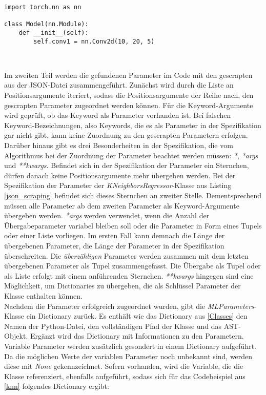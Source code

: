 \documentclass[german,bachelor]{swsLeipzig}
\begin{document}
\noindent\begin{minipage}{\linewidth}
\begin{lstlisting}[language=iPython, frame=single, label=nn_module,  basicstyle=\small, caption={Vererbung der ML-Klasse Module aus PyTorch},captionpos=b]
import torch.nn as nn

class Model(nn.Module):
    def __init__(self):
        self.conv1 = nn.Conv2d(10, 20, 5)
\end{lstlisting}
\end{minipage}
\

\noindent Im zweiten Teil werden die gefundenen Parameter im Code mit den gescrapten aus der JSON-Datei zusammengeführt.
Zunächst wird durch die Liste an Positionsargumente iteriert, sodass die Positionsargumente der Reihe nach,
den gescrapten Parameter zugeordnet werden können.
Für die Keyword-Argumente wird geprüft, ob das Keyword als Parameter vorhanden ist.
Bei falschen Keyword-Bezeichnungen, also Keywords, die es als Parameter in der Spezifikation gar nicht gibt,
kann keine Zuordnung zu den gescrapten Parametern erfolgen. \\
\indent Darüber hinaus gibt es drei Besonderheiten in der Spezifikation, die vom Algorithmus bei der Zuordnung der Parameter
beachtet werden müssen: \textit{*}, \textit{*args} und \textit{**kwargs}.
Befindet sich in der Spezifikation der Parameter ein Sternchen, dürfen danach keine Positionsargumente mehr
übergeben werden.
Bei der Spezifikation der Parameter der \textit{KNeighborsRegressor}-Klasse aus Listing \ref{json_scraping} befindet 
sich dieses Sternchen an zweiter Stelle.
Dementsprechend müssen alle Parameter ab dem zweiten Parameter als Keyword-Argumente übergeben werden.
\textit{*args} werden verwendet, wenn die Anzahl der Übergabeparameter variabel bleiben soll oder die Parameter in Form
eines Tupels oder einer Liste vorliegen.
Im ersten Fall kann demnach die Länge der übergebenen Parameter, die Länge der Parameter in der Spezifikation überschreiten.
Die \textit{überzähligen} Parameter werden zusammen mit dem letzten übergebenen Parameter als Tupel zusammengefasst.
Die Übergabe als Tupel oder als Liste erfolgt mit einem anführenden Sternchen.
\textit{**kwargs} hingegen sind eine Möglichkeit, um Dictionaries zu übergeben, die als Schlüssel Parameter der Klasse
enthalten können. \\

\noindent Nachdem die Parameter erfolgreich zugeordnet wurden, gibt die \textit{MLParameters}-Klasse ein Dictionary zurück.
Es enthält wie das Dictionary aus \ref{Classes} den Namen der Python-Datei, den vollständigen Pfad der Klasse und das AST-Objekt.
Ergänzt wird das Dictionary mit Informationen zu den Parametern.
Variable Parameter werden zusätzlich gesondert in einem Dictionary aufgeführt.
Da die möglichen Werte der variablen Parameter noch unbekannt sind, werden diese mit \textit{None} gekennzeichnet.
Sofern vorhanden, wird die Variable, die die Klasse referenziert, ebenfalls aufgeführt, sodass sich für das Codebeispiel
aus \ref{knn} folgendes Dictionary ergibt:\\
\end{document}

